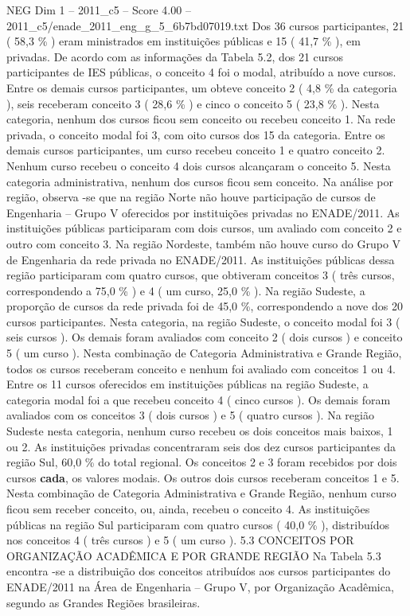 \begin{textsample}{NEG Dim 1 – 2011\_c5 – Score 4.00 – 2011\_c5/enade\_2011\_eng\_g\_5\_6b7bd07019.txt}
Dos 36 cursos participantes, 21 ( 58,3 \% ) eram ministrados em instituições públicas e 15 ( 41,7 \% ), em privadas.
De acordo com as informações da Tabela 5.2, dos 21 cursos participantes de IES públicas, o conceito 4 foi o modal, atribuído a nove cursos.
Entre os demais cursos participantes, um obteve conceito 2 ( 4,8 \% da categoria ), seis receberam conceito 3 ( 28,6 \% ) e cinco o conceito 5 ( 23,8 \% ).
Nesta categoria, nenhum dos cursos ficou sem conceito ou recebeu conceito 1.
Na rede privada, o conceito modal foi 3, com oito cursos dos 15 da categoria.
Entre os demais cursos participantes, um curso recebeu conceito 1 e quatro conceito 2.
Nenhum curso recebeu o conceito 4 dois cursos alcançaram o conceito 5.
Nesta categoria administrativa, nenhum dos cursos ficou sem conceito.
Na análise por região, observa -se que na região Norte não houve participação de cursos de Engenharia – Grupo V oferecidos por instituições privadas no ENADE/2011.
As instituições públicas participaram com dois cursos, um avaliado com conceito 2 e outro com conceito 3.
Na região Nordeste, também não houve curso do Grupo V de Engenharia da rede privada no ENADE/2011.
As instituições públicas dessa região participaram com quatro cursos, que obtiveram conceitos 3 ( três cursos, correspondendo a 75,0 \% ) e 4 ( um curso, 25,0 \% ).
Na região Sudeste, a proporção de cursos da rede privada foi de 45,0 \%, correspondendo a nove dos 20 cursos participantes.
Nesta categoria, na região Sudeste, o conceito modal foi 3 ( seis cursos ).
Os demais foram avaliados com conceito 2 ( dois cursos ) e conceito 5 ( um curso ).
Nesta combinação de Categoria Administrativa e Grande Região, todos os cursos receberam conceito e nenhum foi avaliado com conceitos 1 ou 4.
Entre os 11 cursos oferecidos em instituições públicas na região Sudeste, a categoria modal foi a que recebeu conceito 4 ( cinco cursos ).
Os demais foram avaliados com os conceitos 3 ( dois cursos ) e 5 ( quatro cursos ).
Na região Sudeste nesta categoria, nenhum curso recebeu os dois conceitos mais baixos, 1 ou 2.
As instituições privadas concentraram seis dos dez cursos participantes da região Sul, 60,0 \% do total regional.
Os conceitos 2 e 3 foram recebidos por dois cursos \textbf{cada}, os valores modais.
Os outros dois cursos receberam conceitos 1 e 5.
Nesta combinação de Categoria Administrativa e Grande Região, nenhum curso ficou sem receber conceito, ou, ainda, recebeu o conceito 4.
As instituições públicas na região Sul participaram com quatro cursos ( 40,0 \% ), distribuídos nos conceitos 4 ( três cursos ) e 5 ( um curso ). 5.3 CONCEITOS POR ORGANIZAÇÃO ACADÊMICA E POR GRANDE REGIÃO Na Tabela 5.3 encontra -se a distribuição dos conceitos atribuídos aos cursos participantes do ENADE/2011 na Área de Engenharia – Grupo V, por Organização Acadêmica, segundo as Grandes Regiões brasileiras.

\end{textsample}
